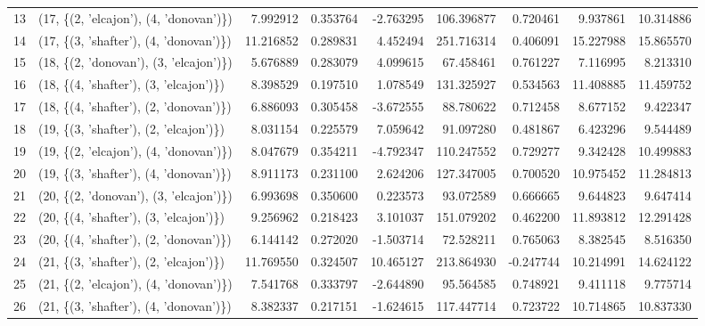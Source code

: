 \begin{tabular}{llrrrrrrr}
13 &  (17, \{(2, 'elcajon'), (4, 'donovan')\}) &   7.992912 &  0.353764 &  -2.763295 &  106.396877 &  0.720461 &   9.937861 &  10.314886 \\
14 &  (17, \{(3, 'shafter'), (4, 'donovan')\}) &  11.216852 &  0.289831 &   4.452494 &  251.716314 &  0.406091 &  15.227988 &  15.865570 \\
15 &  (18, \{(2, 'donovan'), (3, 'elcajon')\}) &   5.676889 &  0.283079 &   4.099615 &   67.458461 &  0.761227 &   7.116995 &   8.213310 \\
16 &  (18, \{(4, 'shafter'), (3, 'elcajon')\}) &   8.398529 &  0.197510 &   1.078549 &  131.325927 &  0.534563 &  11.408885 &  11.459752 \\
17 &  (18, \{(4, 'shafter'), (2, 'donovan')\}) &   6.886093 &  0.305458 &  -3.672555 &   88.780622 &  0.712458 &   8.677152 &   9.422347 \\
18 &  (19, \{(3, 'shafter'), (2, 'elcajon')\}) &   8.031154 &  0.225579 &   7.059642 &   91.097280 &  0.481867 &   6.423296 &   9.544489 \\
19 &  (19, \{(2, 'elcajon'), (4, 'donovan')\}) &   8.047679 &  0.354211 &  -4.792347 &  110.247552 &  0.729277 &   9.342428 &  10.499883 \\
20 &  (19, \{(3, 'shafter'), (4, 'donovan')\}) &   8.911173 &  0.231100 &   2.624206 &  127.347005 &  0.700520 &  10.975452 &  11.284813 \\
21 &  (20, \{(2, 'donovan'), (3, 'elcajon')\}) &   6.993698 &  0.350600 &   0.223573 &   93.072589 &  0.666665 &   9.644823 &   9.647414 \\
22 &  (20, \{(4, 'shafter'), (3, 'elcajon')\}) &   9.256962 &  0.218423 &   3.101037 &  151.079202 &  0.462200 &  11.893812 &  12.291428 \\
23 &  (20, \{(4, 'shafter'), (2, 'donovan')\}) &   6.144142 &  0.272020 &  -1.503714 &   72.528211 &  0.765063 &   8.382545 &   8.516350 \\
24 &  (21, \{(3, 'shafter'), (2, 'elcajon')\}) &  11.769550 &  0.324507 &  10.465127 &  213.864930 & -0.247744 &  10.214991 &  14.624122 \\
25 &  (21, \{(2, 'elcajon'), (4, 'donovan')\}) &   7.541768 &  0.333797 &  -2.644890 &   95.564585 &  0.748921 &   9.411118 &   9.775714 \\
26 &  (21, \{(3, 'shafter'), (4, 'donovan')\}) &   8.382337 &  0.217151 &  -1.624615 &  117.447714 &  0.723722 &  10.714865 &  10.837330 \\
\bottomrule
\end{tabular}
